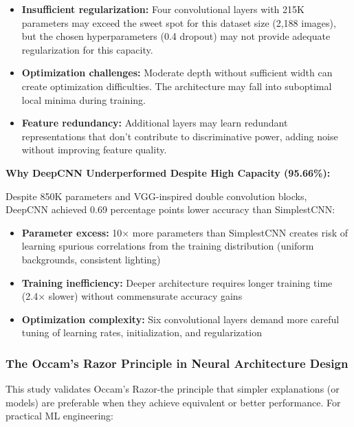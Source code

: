 \documentclass[12pt,a4paper]{article}
\begin{document}
\begin{itemize}
    \item \textbf{Insufficient regularization:} Four convolutional layers with 215K parameters may exceed the sweet spot for this dataset size (2,188 images), but the chosen hyperparameters (0.4 dropout) may not provide adequate regularization for this capacity.
    
    \item \textbf{Optimization challenges:} Moderate depth without sufficient width can create optimization difficulties. The architecture may fall into suboptimal local minima during training.
    
    \item \textbf{Feature redundancy:} Additional layers may learn redundant representations that don't contribute to discriminative power, adding noise without improving feature quality.
\end{itemize}

\textbf{Why DeepCNN Underperformed Despite High Capacity (95.66\%):}

Despite 850K parameters and VGG-inspired double convolution blocks, DeepCNN achieved 0.69 percentage points lower accuracy than SimplestCNN:

\begin{itemize}
    \item \textbf{Parameter excess:} 10× more parameters than SimplestCNN creates risk of learning spurious correlations from the training distribution (uniform backgrounds, consistent lighting)
    
    \item \textbf{Training inefficiency:} Deeper architecture requires longer training time (2.4× slower) without commensurate accuracy gains
    
    \item \textbf{Optimization complexity:} Six convolutional layers demand more careful tuning of learning rates, initialization, and regularization
\end{itemize}

\subsubsection{The Occam's Razor Principle in Neural Architecture Design}

This study validates Occam's Razor-the principle that simpler explanations (or models) are preferable when they achieve equivalent or better performance. For practical ML engineering:
\end{document}
